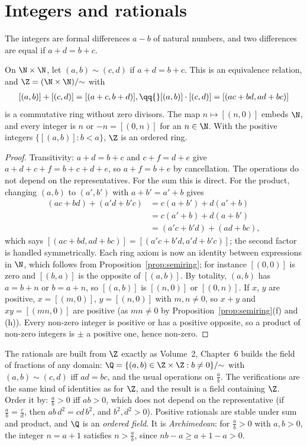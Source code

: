 \section{Integers and rationals}

The integers are formal differences $a-b$ of natural numbers, and two differences are equal if $a+d=b+c$.

\begin{proposition}\label{prop:integers}
On $\N\times\N$, let $(a,b)\sim(c,d)$ if $a+d=b+c$. This is an equivalence relation, and $\Z=(\N\times\N)/{\sim}$ with
\[
\begin{gathered}[(a,b)]+[(c,d)]=[(a+c,b+d)],\qq{}[(a,b)]\cdot[(c,d)]=[(ac+bd,ad+bc)]\end{gathered}
\]
is a commutative ring without zero divisors. The map $n\mapsto[(n,0)]$ embeds $\N$, and every integer is $n$ or $-n=[(0,n)]$ for an $n\in\N$.
With the positive integers $\{[(a,b)]:b<a\}$, $\Z$ is an ordered ring.
\end{proposition}
\begin{proof}
Transitivity: $a+d=b+c$ and $c+f=d+e$ give $a+d+c+f=b+c+d+e$, so $a+f=b+e$ by cancellation. The operations do not depend on
the representatives. For the sum this is direct. For the product, changing $(a,b)$ to $(a',b')$ with $a+b'=a'+b$ gives
\[
\begin{aligned}(ac+bd)+(a'd+b'c)&=c(a+b')+d(a'+b)\\&=c(a'+b)+d(a+b')\\&=(a'c+b'd)+(ad+bc),\end{aligned}
\]
which says $[(ac+bd,ad+bc)]=[(a'c+b'd,a'd+b'c)]$; the second factor is handled symmetrically. Each ring axiom is now an identity
between expressions in $\N$, which follows from Proposition~\ref{prop:semiring}; for instance $[(0,0)]$ is zero and $[(b,a)]$ is the
opposite of $[(a,b)]$. By totality, $(a,b)$ has $a=b+n$ or $b=a+n$, so $[(a,b)]$ is $[(n,0)]$ or $[(0,n)]$. If $x$, $y$ are positive,
$x=[(m,0)]$, $y=[(n,0)]$ with $m,n\ne0$, so $x+y$ and $xy=[(mn,0)]$ are positive (as $mn\ne0$ by Proposition~\ref{prop:semiring}(f) and
(h)). Every non-zero integer is positive or has a positive opposite, so a product of non-zero integers is $\pm$ a positive
one, hence non-zero.
\end{proof}

The rationals are built from $\Z$ exactly as Volume~2, Chapter~6 builds the field of fractions of any domain:
$\Q=\{(a,b)\in\Z\times\Z:b\ne0\}/{\sim}$ with $(a,b)\sim(c,d)$ iff $ad=bc$, and the usual operations on $\frac ab$. The verifications are
the same kind of identities as for $\Z$, and the result is a field containing $\Z$. Order it by: $\frac ab>0$ iff $ab>0$, which
does not depend on the representative (if $\frac ab=\frac cd$, then $ab\,d^2=cd\,b^2$, and $b^2,d^2>0$). Positive rationals are
stable under sum and product, and $\Q$ is an \emph{ordered field}. It is \emph{Archimedean}: for $\frac ab>0$ with $a,b>0$, the
integer $n=a+1$ satisfies $n>\frac ab$, since $nb-a\ge a+1-a>0$.


